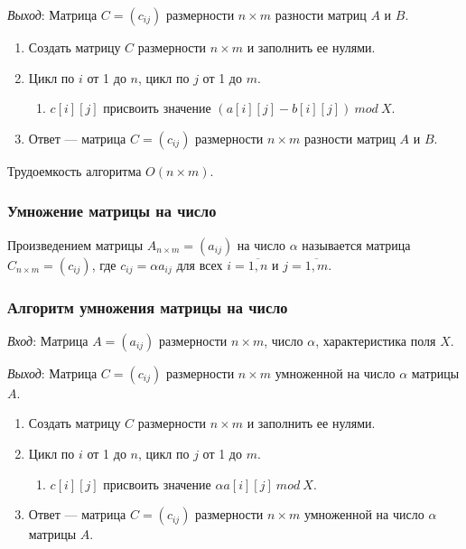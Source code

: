 \documentclass[bachelor, och, labwork]{shiza}
\begin{document}
\textit{Выход}: Матрица $C=(c_{ij})$ размерности $n\times m$ разности 
матриц $A$ и $B$.

\begin{enumerate}
    \item Создать матрицу $C$ размерности $n\times m$ и заполнить ее нулями.
    \item Цикл по $i$ от 1 до $n$, цикл по $j$ от 1 до $m$.
    \begin{enumerate}
        \item $c[i][j]$ присвоить значение $(a[i][j] - b[i][j]) ~mod~ X$.
    \end{enumerate}
    \item Ответ --- матрица $C=(c_{ij})$ размерности $n\times m$ разности матриц $A$ и $B$.
\end{enumerate}

Трудоемкость алгоритма $O(n \times m)$.

\subsubsection{Умножение матрицы на число}

Произведением матрицы $A_{n\times m}=(a_{ij})$ на число $\alpha$ называется матрица
$C_{n\times m}=(c_{ij})$, где $c_{ij}=\alpha a_{ij}$ для всех $i=\overline{1,n}$
и $j=\overline{1,m}$.

\subsubsection{Алгоритм умножения матрицы на число}

\textit{Вход}: Матрица $A=(a_{ij})$ размерности $n\times m$, число $\alpha$, характеристика поля $X$.

\textit{Выход}: Матрица $C=(c_{ij})$ размерности $n\times m$ умноженной на число 
$\alpha$ матрицы $A$.

\begin{enumerate}
    \item Создать матрицу $C$ размерности $n\times m$ и заполнить ее нулями.
    \item Цикл по $i$ от 1 до $n$, цикл по $j$ от 1 до $m$.
    \begin{enumerate}
        \item $c[i][j]$ присвоить значение $\alpha a[i][j] ~mod~ X$.
    \end{enumerate}
    \item Ответ --- матрица $C=(c_{ij})$ размерности $n\times m$ умноженной на число 
    $\alpha$ матрицы $A$.
\end{enumerate}
\end{document}

